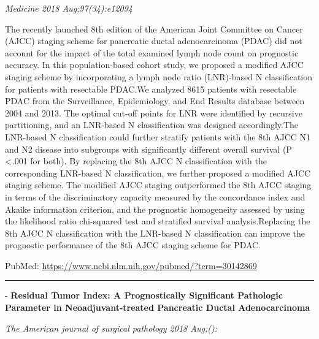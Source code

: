 \documentclass[]{article}
\begin{document}
\emph{Medicine 2018 Aug;97(34):e12094}

The recently launched 8th edition of the American Joint Committee on
Cancer (AJCC) staging scheme for pancreatic ductal adenocarcinoma (PDAC)
did not account for the impact of the total examined lymph node count on
prognostic accuracy. In this population-based cohort study, we proposed
a modified AJCC staging scheme by incorporating a lymph node ratio
(LNR)-based N classification for patients with resectable PDAC.We
analyzed 8615 patients with resectable PDAC from the Surveillance,
Epidemiology, and End Results database between 2004 and 2013. The
optimal cut-off points for LNR were identified by recursive
partitioning, and an LNR-based N classification was designed
accordingly.The LNR-based N classification could further stratify
patients with the 8th AJCC N1 and N2 disease into subgroups with
significantly different overall survival (P \textless{} .001 for both).
By replacing the 8th AJCC N classification with the corresponding
LNR-based N classification, we further proposed a modified AJCC staging
scheme. The modified AJCC staging outperformed the 8th AJCC staging in
terms of the discriminatory capacity measured by the concordance index
and Akaike information criterion, and the prognostic homogeneity
assessed by using the likelihood ratio chi-squared test and stratified
survival analysis.Replacing the 8th AJCC N classification with the
LNR-based N classification can improve the prognostic performance of the
8th AJCC staging scheme for PDAC.

PubMed: \url{https://www.ncbi.nlm.nih.gov/pubmed/?term=30142869}

{}

{}

\begin{center}\rule{0.5\linewidth}{\linethickness}\end{center}

 - \textbf{Residual Tumor Index: A Prognostically Significant Pathologic
Parameter in Neoadjuvant-treated Pancreatic Ductal Adenocarcinoma}

\emph{The American journal of surgical pathology 2018 Aug;():}
\end{document}
